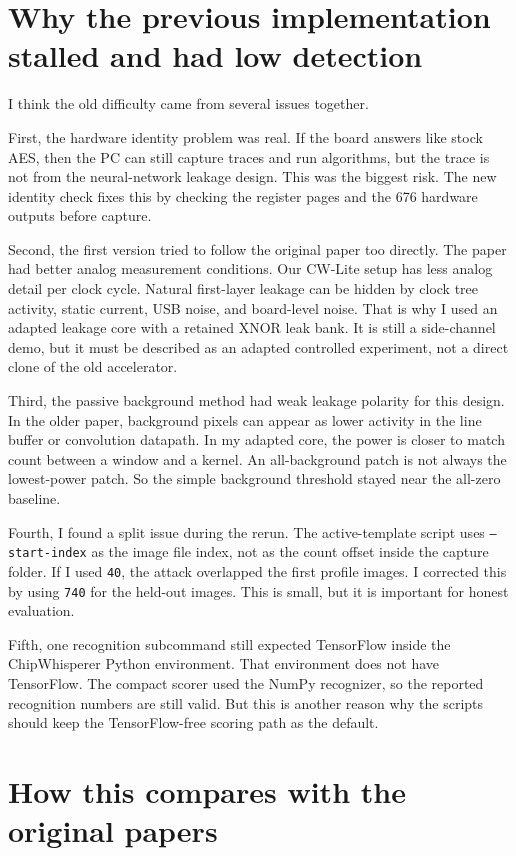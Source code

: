 \documentclass[11pt]{article}
\begin{document}
\section*{Why the previous implementation stalled and had low detection}

I think the old difficulty came from several issues together.

First, the hardware identity problem was real. If the board answers like stock
AES, then the PC can still capture traces and run algorithms, but the trace is
not from the neural-network leakage design. This was the biggest risk. The new
identity check fixes this by checking the register pages and the 676 hardware
outputs before capture.

Second, the first version tried to follow the original paper too directly. The
paper had better analog measurement conditions. Our CW-Lite setup has less
analog detail per clock cycle. Natural first-layer leakage can be hidden by
clock tree activity, static current, USB noise, and board-level noise. That is
why I used an adapted leakage core with a retained XNOR leak bank. It is still a
side-channel demo, but it must be described as an adapted controlled experiment,
not a direct clone of the old accelerator.

Third, the passive background method had weak leakage polarity for this design.
In the older paper, background pixels can appear as lower activity in the line
buffer or convolution datapath. In my adapted core, the power is closer to match
count between a window and a kernel. An all-background patch is not always the
lowest-power patch. So the simple background threshold stayed near the all-zero
baseline.

Fourth, I found a split issue during the rerun. The active-template script uses
\texttt{--start-index} as the image file index, not as the count offset inside
the capture folder. If I used \texttt{40}, the attack overlapped the first
profile images. I corrected this by using \texttt{740} for the held-out images.
This is small, but it is important for honest evaluation.

Fifth, one recognition subcommand still expected TensorFlow inside the
ChipWhisperer Python environment. That environment does not have TensorFlow.
The compact scorer used the NumPy recognizer, so the reported recognition
numbers are still valid. But this is another reason why the scripts should keep
the TensorFlow-free scoring path as the default.

\section*{How this compares with the original papers}
\end{document}
